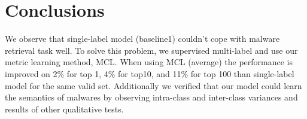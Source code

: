 \section{Conclusions}


We observe that single-label model (baseline1) couldn't cope with malware retrieval task well. 
To solve this problem, we supervised multi-label and use our metric learning method, MCL. 
When using MCL (average) the performance is improved on 2\% for top 1, 4\% for top10, and 11\% for top 100 than single-label model for the same valid set. 
Additionally we verified that our model could learn the semantics of malwares by observing intra-class and inter-class variances and results of other qualitative tests.




\appendix


\begin{acks}
\end{acks}
